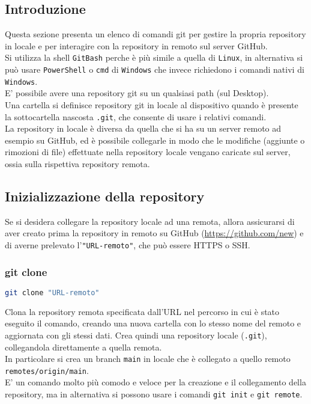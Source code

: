 \subsection*{Introduzione}
Questa sezione presenta un elenco di comandi git per gestire la propria repository in locale e per interagire con la repository in remoto sul server GitHub.\vspace{.3cm}\\
Si utilizza la shell \texttt{GitBash} perche è più simile a quella di \texttt{Linux}, in alternativa si può usare \texttt{PowerShell} o \texttt{cmd} di \texttt{Windows} che invece richiedono i comandi nativi di \texttt{Windows}.\vspace{.3cm}\\
E' possibile avere una repository git su un qualsiasi path (sul Desktop).\\
Una cartella si definisce repository git in locale al dispositivo quando è presente la sottocartella nascosta \texttt{.git}, che consente di usare i relativi comandi.\\
La repository in locale è diversa da quella che si ha su un server remoto ad esempio su GitHub, ed è possibile collegarle in modo che le modifiche (aggiunte o rimozioni di file) effettuate nella repository locale vengano caricate sul server, ossia sulla rispettiva repository remota.


\subsection{Inizializzazione della repository}
Se si desidera collegare la repository locale ad una remota, allora assicurarsi di aver creato prima la repository in remoto su GitHub (\url{https://github.com/new}) e di averne prelevato l'\texttt{\color{blue!70!black}"URL-remoto"}, che può essere HTTPS o SSH.

\subsubsection{git clone}
\begin{lstlisting}[language=bash]
	git clone "URL-remoto"
\end{lstlisting}
Clona la repository remota specificata dall'URL nel percorso in cui è stato eseguito il comando, creando una nuova cartella con lo stesso nome del remoto e aggiornata con gli stessi dati.
Crea quindi una repository locale (\texttt{.git}), collegandola direttamente a quella remota.\\
In particolare si crea un branch \texttt{main} in locale che è collegato a quello remoto \texttt{remotes/origin/main}.\\
E' un comando molto più comodo e veloce per la creazione e il collegamento della repository, ma in alternativa si possono usare i comandi \texttt{git init} e \texttt{git remote}.

